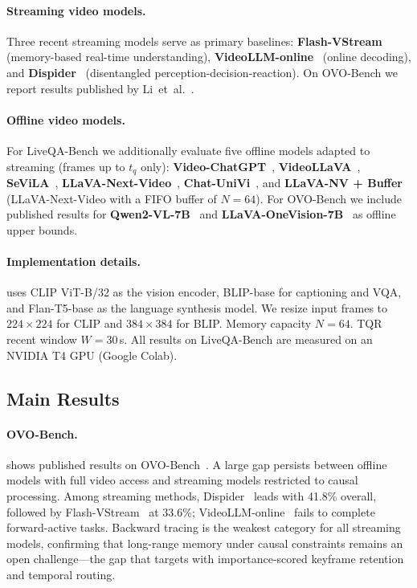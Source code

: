 \paragraph{Streaming video models.}
Three recent streaming models serve as primary baselines:
\textbf{Flash-VStream}~\cite{zhang2024flashvstream} (memory-based real-time understanding),
\textbf{VideoLLM-online}~\cite{chen2024videollmonline} (online decoding), and
\textbf{Dispider}~\cite{he2024dispider} (disentangled perception-decision-reaction).
On OVO-Bench we report results published by Li~et~al.~\cite{li2025ovobench}.

\paragraph{Offline video models.}
For LiveQA-Bench we additionally evaluate five offline models adapted to streaming (frames up to $t_q$ only):
\textbf{Video-ChatGPT}~\cite{maaz2023videochatgpt},
\textbf{VideoLLaVA}~\cite{lin2023videollava},
\textbf{SeViLA}~\cite{yu2023sevila},
\textbf{LLaVA-Next-Video}~\cite{zhang2024llavanextvideo},
\textbf{Chat-UniVi}~\cite{jin2024chatunivi},
and \textbf{LLaVA-NV + Buffer} (LLaVA-Next-Video with a FIFO buffer of $N\!=\!64$).
For OVO-Bench we include published results for \textbf{Qwen2-VL-7B}~\cite{wang2024qwen2vl} and \textbf{LLaVA-OneVision-7B}~\cite{li2024llavaonevision} as offline upper bounds.

\paragraph{Implementation details.}
\ours uses CLIP ViT-B/32 as the vision encoder, BLIP-base for captioning and VQA, and Flan-T5-base as the language synthesis model.
We resize input frames to $224\times224$ for CLIP and $384\times384$ for BLIP. Memory capacity $N\!=\!64$. TQR recent window $W\!=\!30$\,s.
All \ours results on LiveQA-Bench are measured on an NVIDIA T4 GPU (Google Colab).


\subsection{Main Results}

\paragraph{OVO-Bench.}
 shows published results on OVO-Bench~\cite{li2025ovobench}.
A large gap persists between offline models with full video access and streaming models restricted to causal processing.
Among streaming methods, Dispider~\cite{he2024dispider} leads with 41.8\% overall, followed by Flash-VStream~\cite{zhang2024flashvstream} at 33.6\%; VideoLLM-online~\cite{chen2024videollmonline} fails to complete forward-active tasks.
Backward tracing is the weakest category for all streaming models, confirming that long-range memory under causal constraints remains an open challenge---the gap that \ours targets with importance-scored keyframe retention and temporal routing.

